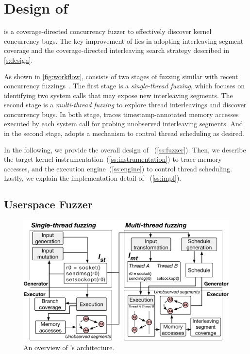 \section{Design of \sys}
\label{s:impl}

\sys is a coverage-directed concurrency fuzzer to effectively discover
kernel concurrency bugs.
%
The key improvement of \sys lies in adopting interleaving segment
coverage and the coverage-directed interleaving search strategy
described in \autoref{s:design}.
%

As shown in \autoref{fig:workflow}, \sys consists of two stages of
fuzzing similar with recent concurrency fuzzings~\cite{razzer,
  snowboard}.
%
The first stage is a \textit{single-thread fuzzing}, which focuses on
identifying two system calls that may expose new interleaving
segments.
%
The second stage is a \textit{multi-thread fuzzing} to explore thread
interleavings and discover concurrency bugs.
%
In both stage, \sys traces timestamp-annotated memory accesses
executed by each system call for probing unobserved interleaving
segments.
%
And in the second stage, \sys adopts a mechanism to control thread
scheduling as desired.



In the following, we provide the overall design of
\sys~(\autoref{ss:fuzzer}).
%
Then, we describe the target kernel
instrumentation~(\autoref{ss:instrumentation}) to trace memory
accesses, and the execution engine~(\autoref{ss:engine}) to control
thread scheduling.
%
Lastly, we explain the implementation detail of
\sys~(\autoref{ss:impl}).




\subsection{Userspace Fuzzer}
\label{ss:fuzzer}



\begin{figure}
  \centering
  \includegraphics[width=\linewidth]{fig/architecture.pdf}
  \caption{An overview of \sys's architecture.}
  \label{fig:workflow}
\end{figure}


